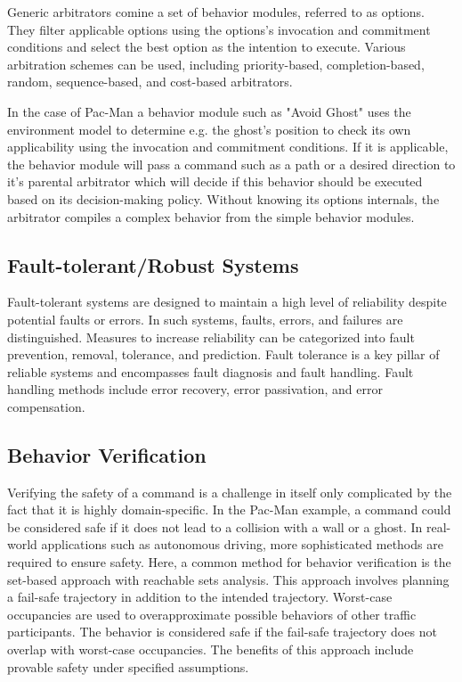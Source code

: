 Generic arbitrators comine a set of behavior modules, referred to as options.
They filter applicable options using the options's invocation and commitment conditions and select the best option as the intention to execute.
Various arbitration schemes can be used, including priority-based, completion-based, random, sequence-based, and cost-based arbitrators.

In the case of Pac-Man a behavior module such as "Avoid Ghost" uses the environment model to determine e.g. the ghost's position to check its own applicability using the invocation and commitment conditions.
If it is applicable, the behavior module will pass a command such as a path or a desired direction to it's parental arbitrator which will decide if this behavior should be executed based on its decision-making policy.
Without knowing its options internals, the arbitrator compiles a complex behavior from the simple behavior modules.

\subsection{Fault-tolerant/Robust Systems}

Fault-tolerant systems are designed to maintain a high level of reliability despite potential faults or errors.
In such systems, faults, errors, and failures are distinguished.
Measures to increase reliability can be categorized into fault prevention, removal, tolerance, and prediction.
Fault tolerance is a key pillar of reliable systems and encompasses fault diagnosis and fault handling.
Fault handling methods include error recovery, error passivation, and error compensation.

\subsection{Behavior Verification}

Verifying the safety of a command is a challenge in itself only complicated by the fact that it is highly domain-specific.
In the Pac-Man example, a command could be considered safe if it does not lead to a collision with a wall or a ghost.
In real-world applications such as autonomous driving, more sophisticated methods are required to ensure safety.
Here, a common method for behavior verification is the set-based approach with reachable sets analysis.
This approach involves planning a fail-safe trajectory in addition to the intended trajectory.
Worst-case occupancies are used to overapproximate possible behaviors of other traffic participants.
The behavior is considered safe if the fail-safe trajectory does not overlap with worst-case occupancies.
The benefits of this approach include provable safety under specified assumptions.

